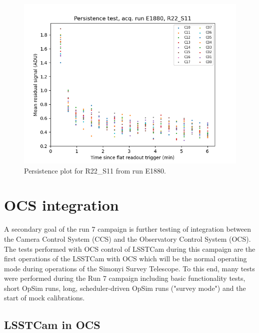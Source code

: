 \begin{figure}
    \centering
    \includegraphics[width=0.8\linewidth]{figures/ReferenceFigures/persistence_plot_LSSTCam_R22_S11_u_lsstccs_eo_persistence_E1880_w_2024_35_20241101T020526Z.png}
    \caption{Persistence plot for R22\_S11 from run E1880.}
    \label{fig:ref:persistence}
\end{figure}

\clearpage
\section{OCS integration}
A secondary goal of the run 7 campaign is further testing of integration between the Camera Control System (CCS) and the Observatory Control System (OCS). The tests performed with OCS control of LSSTCam during this campaign are the first operations of the LSSTCam with OCS which will be the normal operating mode during operations of the Simonyi Survey Telescope. To this end, many tests were performed during the Run 7 campaign including basic functionality tests, short OpSim runs, long, scheduler-driven OpSim runs ("survey mode") and the start of mock calibrations.

\subsection{LSSTCam in OCS}

